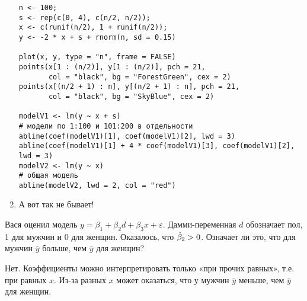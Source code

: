 \begin{problem}
\begin{sol}
\begin{enumerate}
\begin{verbatim}
n <- 100;
s <- rep(c(0, 4), c(n/2, n/2));
x <- c(runif(n/2), 1 + runif(n/2));
y <- -2 * x + s + rnorm(n, sd = 0.15)

plot(x, y, type = "n", frame = FALSE)
points(x[1 : (n/2)], y[1 : (n/2)], pch = 21,
       col = "black", bg = "ForestGreen", cex = 2)
points(x[(n/2 + 1) : n], y[(n/2 + 1) : n], pch = 21,
       col = "black", bg = "SkyBlue", cex = 2)

modelV1 <- lm(y ~ x + s)
# модели по 1:100 и 101:200 в отдельности
abline(coef(modelV1)[1], coef(modelV1)[2], lwd = 3)
abline(coef(modelV1)[1] + 4 * coef(modelV1)[3], coef(modelV1)[2], lwd = 3)
modelV2 <- lm(y ~ x)
# общая модель
abline(modelV2, lwd = 2, col = "red")
\end{verbatim}

\begin{minipage}{0.6\textwidth}
\begin{center}
\begin{tikzpicture}[scale = 0.025]

\end{tikzpicture}
\end{center}
\end{minipage}

\item А вот так не бывает!
\end{enumerate}
\end{sol}
\end{problem}




\begin{problem} %
Вася оценил модель $y=\beta_1+\beta_2 d+\beta_3 x+\varepsilon$. Дамми-переменная $d$ обозначает пол, 1 для мужчин и 0 для женщин. Оказалось, что $\hb_2>0$. Означает ли это, что для мужчин $\bar{y}$ больше, чем $\bar{y}$ для женщин?


\begin{sol}
Нет. Коэффициенты можно интерпретировать только «при прочих равных», т.е. при равных $x$. Из-за разных $x$ может оказаться, что у мужчин $\bar{y}$ меньше, чем $\bar{y}$ для женщин.
\end{sol}
\end{problem}




